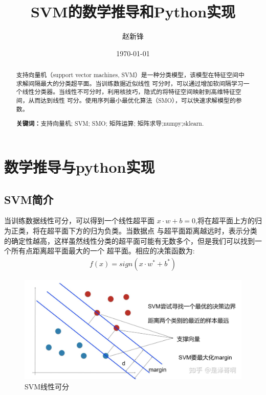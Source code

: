 \documentclass[12pt, a4paper, oneside]{ctexart}
\title{\textbf{SVM的数学推导和Python实现}}
\author{赵新锋}
\date{\today}
\begin{document}
\maketitle

\setcounter{page}{0}
\maketitle
\thispagestyle{empty}

\begin{abstract}
支持向量机（support vector machines, SVM）是一种分类模型，该模型在特征空间中求解间隔最大的分类超平面。当训练数据近似线性
可分时，可以通过增加软间隔学习一个线性分类器。当线性不可分时，利用核技巧，隐式的将特征空间映射到高维特征空间，从而达到线性
可分。使用序列最小最优化算法（SMO），可以快速求解模型的参数。
\par\textbf{关键词：}支持向量机; SVM; SMO; 矩阵运算; 矩阵求导;numpy;sklearn. 
\end{abstract}

\newpage
{}
\setcounter{page}{1}
\tableofcontents
\newpage
\setcounter{page}{1}


\newpage
\section{数学推导与python实现}

\subsection{SVM简介}
当训练数据线性可分，可以得到一个线性超平面 $ x \cdot w + b = 0 $,将在超平面上方的归为正类，将在超平面下方的归为负类。当数据点
与超平面距离越远时，表示分类的确定性越高，这样虽然线性分类的超平面可能有无数多个，但是我们可以找到一个所有点距离超平面最大的一个
超平面。相应的决策函数为:
\begin{align*}
    f(x) = sign(x \cdot w^* + b^*)
\end{align*}
\begin{figure}[htbp]
    \centering
    \includegraphics[width=14cm]{svm1.jpg}
    \caption{SVM线性可分}\label{fig1}
\end{figure}
\end{document}
